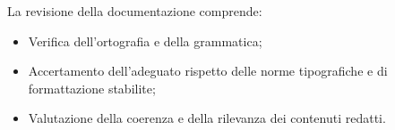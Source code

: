 La revisione della documentazione comprende:
\begin{itemize}
    \item Verifica dell'ortografia e della grammatica;
    \item Accertamento dell'adeguato rispetto delle norme tipografiche e di formattazione stabilite;
    \item Valutazione della coerenza e della rilevanza dei contenuti redatti.
\end{itemize}
